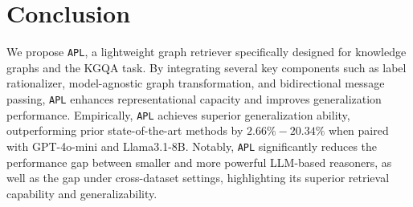 \documentclass{article}
\theoremstyle{plain}
\theoremstyle{definition}
\theoremstyle{remark}
\newcommand{\proj}{\texttt{\scalebox{1.03}{R}APL}}
\begin{document}
 
\section{Conclusion}
We propose \proj{}, a lightweight graph retriever specifically designed for knowledge graphs and the KGQA task. By integrating several key components such as label rationalizer, model-agnostic graph transformation, and bidirectional message passing, \proj{} enhances representational capacity and improves generalization performance. Empirically, \proj{} achieves superior generalization ability, outperforming prior state-of-the-art methods by $2.66\%-20.34\%$ when paired with GPT-4o-mini and Llama3.1-8B. Notably, \proj{} significantly reduces the performance gap between smaller and more powerful LLM-based reasoners, as well as the gap under cross-dataset settings, highlighting its superior retrieval capability and generalizability.


{\small

}
\appendix
\newpage

\end{document}

